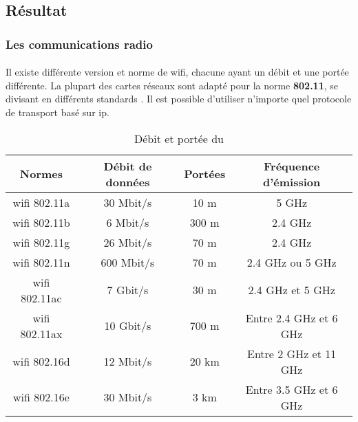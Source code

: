 \subsection{Résultat}
\label{sec:comparaisonProtocoleCommnunicationResultats}

\subsubsection{Les communications radio}
\label{sec:communicationRadio}

\paragraph{}
\label{sec:wifi}

Il existe différente version et norme de \gls{wifi}, chacune ayant un débit et une portée différente.
La plupart des cartes réseaux sont adapté pour la norme \textbf{802.11}, se divisant en différents standards
\cite{wifi}. Il est possible d’utiliser n’importe quel protocole de transport basé sur \gls{ip}.\newline

\begin{table}[ht!]
    \centering
    \begin{tabular}{|c|c|c|c|}
        \hline
        \rowcolor{tableColorDark} Normes & Débit de données & Portées & Fréquence d'émission   \\
        \hline

        \gls{wifi} 802.11a               & 30 Mbit/s        & 10 m    & 5 GHz                  \\\hline
        \gls{wifi} 802.11b               & 6 Mbit/s         & 300 m   & 2.4 GHz                \\\hline
        \gls{wifi} 802.11g               & 26 Mbit/s        & 70 m    & 2.4 GHz                \\\hline
        \gls{wifi} 802.11n               & 600 Mbit/s       & 70 m    & 2.4 GHz ou 5 GHz       \\\hline
        \gls{wifi} 802.11ac              & 7 Gbit/s         & 30 m    & 2.4 GHz et 5 GHz       \\\hline
        \gls{wifi} 802.11ax              & 10 Gbit/s        & 700 m   & Entre 2.4 GHz et 6 GHz \\\hline
        \gls{wifi} 802.16d               & 12 Mbit/s        & 20 km   & Entre 2 GHz et 11 GHz  \\\hline
        \gls{wifi} 802.16e               & 30 Mbit/s        & 3 km    & Entre 3.5 GHz et 6 GHz \\\hline
    \end{tabular}
    \label{tab:debitPorteeWifi}
    \caption{Débit et portée du }
    \nocite{debitPortee}
\end{table}

